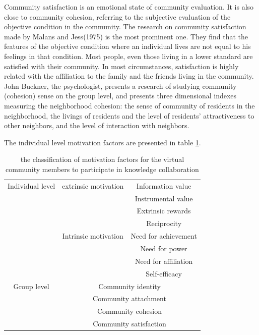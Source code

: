 \documentclass{elsarticle}
\begin{document}
Community satisfaction is an emotional state of community
evaluation. It is also close to community cohesion, referring to the
subjective evaluation of the objective condition in the community. The
research on community satisfaction made by Malans and Jess(1975) is
the most prominent one. They find that the features of the objective
condition where an individual lives are not equal to his feelings in
that condition. Most people, even those living in a lower standard are
satisfied with their community. In most circumstances, satisfaction is
highly related with the affiliation to the family and the friends
living in the community\cite{marans1975tuc}. John Buckner, the psychologist, presents
a research of studying community (cohesion) sense on the group level,
and presents three dimensional indexes measuring the neighborhood
cohesion: the sense of community of residents in the neighborhood, the
livings of residents and the level of residents’ attractiveness to
other neighbors, and the level of interaction with
neighbors\cite{buckner1988dim}.

The individual level motivation factors are presented in table \ref{tab:individual-level}.

\begin{table}[htpb]
  \label{tab:individual-level}
  \centering
   \caption{the classification of motivation factors for the virtual
    community members to participate in knowledge collaboration}
\begin{tabular}{ccc}
    \toprule
    \multicolumn{ 1}{c|}{Individual level} & \multicolumn{ 1}{|c|}{extrinsic motivation} & Information value \\
    \multicolumn{ 1}{c|}{} & \multicolumn{ 1}{|c|}{} & Instrumental value \\
    \multicolumn{ 1}{c|}{} & \multicolumn{ 1}{|c|}{} & Extrinsic rewards \\
    \multicolumn{ 1}{c|}{} & \multicolumn{ 1}{|c|}{} & Reciprocity \\\cline{2-3}
    \multicolumn{ 1}{c|}{} & \multicolumn{ 1}{|c|}{Intrinsic motivation} & Need for achievement \\
    \multicolumn{ 1}{c|}{} & \multicolumn{ 1}{|c|}{} & Need for power \\
    \multicolumn{ 1}{c|}{} & \multicolumn{ 1}{|c|}{} & Need for affiliation \\
    \multicolumn{ 1}{c|}{} & \multicolumn{ 1}{|c|}{} & Self-efficacy \\\hline
    \multicolumn{ 1}{c|}{Group level} & \multicolumn{ 2}{|c}{Community identity} \\
    \multicolumn{ 1}{c|}{} & \multicolumn{ 2}{|c}{Community attachment} \\
    \multicolumn{ 1}{c|}{} & \multicolumn{ 2}{|c}{Community cohesion} \\
    \multicolumn{ 1}{c|}{} & \multicolumn{ 2}{|c}{Community satisfaction} \\
    \bottomrule
    \end{tabular}
\end{table}
\end{document}
